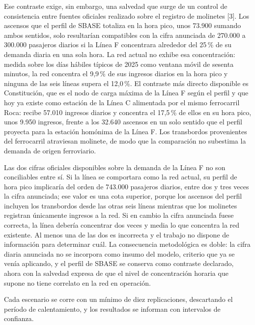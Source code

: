 \documentclass{article}
\begin{document}
Ese contraste exige, sin embargo, una salvedad que surge de un control de consistencia entre fuentes
oficiales realizado sobre el registro de molinetes [3]. Los ascensos que el perfil de SBASE totaliza en la
hora pico, unos 73.900 sumando ambos sentidos, solo resultarían compatibles con la cifra anunciada de
270.000 a 300.000 pasajeros diarios si la Línea F concentrara alrededor del 25\,\% de su demanda diaria en
una sola hora. La red actual no exhibe esa concentración: medida sobre los días hábiles típicos de 2025 como
ventana móvil de sesenta minutos, la red concentra el 9,9\,\% de sus ingresos diarios en la hora pico y
ninguna de las seis líneas supera el 12,0\,\%. El contraste más directo disponible es Constitución, que es
el nodo de carga máxima de la Línea F según el perfil y que hoy ya existe como estación de la Línea C
alimentada por el mismo ferrocarril Roca: recibe 57.010 ingresos diarios y concentra el 17,5\,\% de ellos
en su hora pico, unos 9.950 ingresos, frente a los 32.640 ascensos en un solo sentido que el perfil proyecta
para la estación homónima de la Línea F. Los transbordos provenientes del ferrocarril atraviesan molinete,
de modo que la comparación no subestima la demanda de origen ferroviario.

Las dos cifras oficiales disponibles sobre la demanda de la Línea F no son conciliables entre sí. Si la
línea se comportara como la red actual, su perfil de hora pico implicaría del orden de 743.000 pasajeros
diarios, entre dos y tres veces la cifra anunciada; ese valor es una cota superior, porque los ascensos del
perfil incluyen los transbordos desde las otras seis líneas mientras que los molinetes registran únicamente
ingresos a la red. Si en cambio la cifra anunciada fuese correcta, la línea debería concentrar dos veces y
media lo que concentra la red existente. Al menos una de las dos es incorrecta y el trabajo no dispone de
información para determinar cuál. La consecuencia metodológica es doble: la cifra diaria anunciada no se
incorpora como insumo del modelo, criterio que ya se venía aplicando, y el perfil de SBASE se conserva como
contraste declarado, ahora con la salvedad expresa de que el nivel de concentración horaria que supone no
tiene correlato en la red en operación.

Cada escenario se corre con un mínimo de diez replicaciones, descartando el período de calentamiento, y los
resultados se informan con intervalos de confianza.
\end{document}
